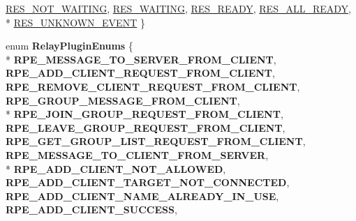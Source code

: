 \begin{DoxyCompactItemize}
\hyperlink{group___r_e_a_d_y___e_v_e_n_t___g_r_o_u_p_ggaf87e91389822570de07c01ccb37b0bbfaae9eddc72c92a7fb6535842e27cc229d}{R\-E\-S\-\_\-\-N\-O\-T\-\_\-\-W\-A\-I\-T\-I\-N\-G}, 
\hyperlink{group___r_e_a_d_y___e_v_e_n_t___g_r_o_u_p_ggaf87e91389822570de07c01ccb37b0bbfac08624b173b9413518dea1943c5ce1ea}{R\-E\-S\-\_\-\-W\-A\-I\-T\-I\-N\-G}, 
\hyperlink{group___r_e_a_d_y___e_v_e_n_t___g_r_o_u_p_ggaf87e91389822570de07c01ccb37b0bbfa0f332e9cc8fab608e8cc4f720395419e}{R\-E\-S\-\_\-\-R\-E\-A\-D\-Y}, 
\hyperlink{group___r_e_a_d_y___e_v_e_n_t___g_r_o_u_p_ggaf87e91389822570de07c01ccb37b0bbfa8bf16c6f817bfadc773a14b411e2eef7}{R\-E\-S\-\_\-\-A\-L\-L\-\_\-\-R\-E\-A\-D\-Y}, 
\\*
\hyperlink{group___r_e_a_d_y___e_v_e_n_t___g_r_o_u_p_ggaf87e91389822570de07c01ccb37b0bbfa55a734d26b096d2fbd784bfb3a2564e7}{R\-E\-S\-\_\-\-U\-N\-K\-N\-O\-W\-N\-\_\-\-E\-V\-E\-N\-T}
 \}
\item 
enum {\bfseries Relay\-Plugin\-Enums} \{ \\*
{\bfseries R\-P\-E\-\_\-\-M\-E\-S\-S\-A\-G\-E\-\_\-\-T\-O\-\_\-\-S\-E\-R\-V\-E\-R\-\_\-\-F\-R\-O\-M\-\_\-\-C\-L\-I\-E\-N\-T}, 
{\bfseries R\-P\-E\-\_\-\-A\-D\-D\-\_\-\-C\-L\-I\-E\-N\-T\-\_\-\-R\-E\-Q\-U\-E\-S\-T\-\_\-\-F\-R\-O\-M\-\_\-\-C\-L\-I\-E\-N\-T}, 
{\bfseries R\-P\-E\-\_\-\-R\-E\-M\-O\-V\-E\-\_\-\-C\-L\-I\-E\-N\-T\-\_\-\-R\-E\-Q\-U\-E\-S\-T\-\_\-\-F\-R\-O\-M\-\_\-\-C\-L\-I\-E\-N\-T}, 
{\bfseries R\-P\-E\-\_\-\-G\-R\-O\-U\-P\-\_\-\-M\-E\-S\-S\-A\-G\-E\-\_\-\-F\-R\-O\-M\-\_\-\-C\-L\-I\-E\-N\-T}, 
\\*
{\bfseries R\-P\-E\-\_\-\-J\-O\-I\-N\-\_\-\-G\-R\-O\-U\-P\-\_\-\-R\-E\-Q\-U\-E\-S\-T\-\_\-\-F\-R\-O\-M\-\_\-\-C\-L\-I\-E\-N\-T}, 
{\bfseries R\-P\-E\-\_\-\-L\-E\-A\-V\-E\-\_\-\-G\-R\-O\-U\-P\-\_\-\-R\-E\-Q\-U\-E\-S\-T\-\_\-\-F\-R\-O\-M\-\_\-\-C\-L\-I\-E\-N\-T}, 
{\bfseries R\-P\-E\-\_\-\-G\-E\-T\-\_\-\-G\-R\-O\-U\-P\-\_\-\-L\-I\-S\-T\-\_\-\-R\-E\-Q\-U\-E\-S\-T\-\_\-\-F\-R\-O\-M\-\_\-\-C\-L\-I\-E\-N\-T}, 
{\bfseries R\-P\-E\-\_\-\-M\-E\-S\-S\-A\-G\-E\-\_\-\-T\-O\-\_\-\-C\-L\-I\-E\-N\-T\-\_\-\-F\-R\-O\-M\-\_\-\-S\-E\-R\-V\-E\-R}, 
\\*
{\bfseries R\-P\-E\-\_\-\-A\-D\-D\-\_\-\-C\-L\-I\-E\-N\-T\-\_\-\-N\-O\-T\-\_\-\-A\-L\-L\-O\-W\-E\-D}, 
{\bfseries R\-P\-E\-\_\-\-A\-D\-D\-\_\-\-C\-L\-I\-E\-N\-T\-\_\-\-T\-A\-R\-G\-E\-T\-\_\-\-N\-O\-T\-\_\-\-C\-O\-N\-N\-E\-C\-T\-E\-D}, 
{\bfseries R\-P\-E\-\_\-\-A\-D\-D\-\_\-\-C\-L\-I\-E\-N\-T\-\_\-\-N\-A\-M\-E\-\_\-\-A\-L\-R\-E\-A\-D\-Y\-\_\-\-I\-N\-\_\-\-U\-S\-E}, 
{\bfseries R\-P\-E\-\_\-\-A\-D\-D\-\_\-\-C\-L\-I\-E\-N\-T\-\_\-\-S\-U\-C\-C\-E\-S\-S}, 

\end{DoxyCompactItemize}
